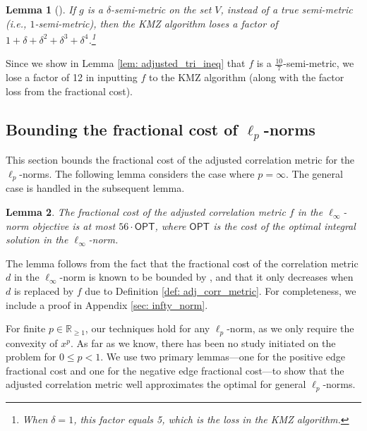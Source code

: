 \documentclass[11pt]{article}
\newtheorem{lemma}{Lemma}
\begin{document}
\begin{lemma}[\cite{DMN23}]\label{lem: apx-tri}
    If $g$ is a $\delta$-semi-metric on the set $V$, instead of a true  semi-metric (i.e., $1$-semi-metric), then the KMZ algorithm loses a factor of $1+\delta+\delta^2+\delta^3+\delta^4$.\footnote{When $\delta =1$, this factor equals 5, which is the loss in the KMZ algorithm.}
\end{lemma}
Since we show in Lemma \ref{lem: adjusted_tri_ineq} that $f$ is a $\frac{10}{7}$-semi-metric,
we lose a factor of 12 in inputting $f$ to the KMZ algorithm (along with the factor loss from the fractional cost).



\subsection{Bounding the fractional cost of $\ell_p$-norms}\label{sec: lp-norm}
This section bounds the fractional cost of the adjusted correlation metric for the $\ell_p$-norms.  The following lemma considers the case where $p=\infty$.  The general case is handled in the subsequent lemma.

\begin{lemma} \label{lem: infty_proof}
    The fractional cost of the adjusted correlation metric $f$ in the $\ell_{\infty}$-norm objective is at most $56 \cdot \textsf{OPT}$, where $\textsf{OPT}$ is the cost of the optimal integral solution in the $\ell_{\infty}$-norm.
\end{lemma}

The lemma follows from the fact that the fractional cost of the correlation metric $d$ in the $\ell_{\infty}$-norm is known to be bounded by \cite{DMN23}, and that it only decreases when $d$ is replaced by $f$ due to Definition \ref{def: adj_corr_metric}. For completeness, we include a proof in Appendix \ref{sec: infty_norm}. 

For finite $p \in \mathbb{R}_{\geq 1}$, our techniques hold for any $\ell_p$-norm, as we only require the convexity of $x^p$. As far as we know, there has been no study initiated on the problem for $0 \leq p<1$.
We use two primary lemmas---one for the positive edge fractional cost and one for the negative edge fractional cost---to show that the adjusted correlation metric well approximates the optimal for general $\ell_p$-norms.
\end{document}
